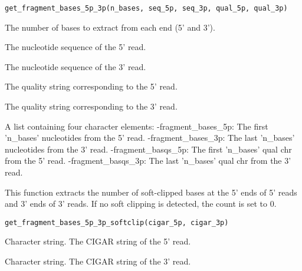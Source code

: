 \documentclass[a4paper]{book}
\begin{document}
%
\begin{Usage}
\begin{verbatim}
get_fragment_bases_5p_3p(n_bases, seq_5p, seq_3p, qual_5p, qual_3p)
\end{verbatim}
\end{Usage}
%
\begin{Arguments}
\begin{ldescription}
\item[\code{n\_bases}] The number of bases to extract from each end (5' and 3').

\item[\code{seq\_5p}] The nucleotide sequence of the 5' read.

\item[\code{seq\_3p}] The nucleotide sequence of the 3' read.

\item[\code{qual\_5p}] The quality string corresponding to the 5' read.

\item[\code{qual\_3p}] The quality string corresponding to the 3' read.
\end{ldescription}
\end{Arguments}
%
\begin{Value}
A list containing four character elements:
-fragment\_bases\_5p: The first 'n\_bases' nucleotides from the 5' read.
-fragment\_bases\_3p: The last 'n\_bases' nucleotides from the 3' read.
-fragment\_basqs\_5p: The first 'n\_bases' qual chr from the 5' read.
-fragment\_basqs\_3p: The last 'n\_bases' qual chr from the 3' read.
\end{Value}
%
\begin{Description}
This function extracts the number of soft-clipped bases at the 5' ends of 5' reads and 3' ends of 3' reads.
If no soft clipping is detected, the count is set to 0.
\end{Description}
%
\begin{Usage}
\begin{verbatim}
get_fragment_bases_5p_3p_softclip(cigar_5p, cigar_3p)
\end{verbatim}
\end{Usage}
%
\begin{Arguments}
\begin{ldescription}
\item[\code{cigar\_5p}] Character string. The CIGAR string of the 5' read.

\item[\code{cigar\_3p}] Character string. The CIGAR string of the 3' read.
\end{ldescription}
\end{Arguments}
\end{document}
